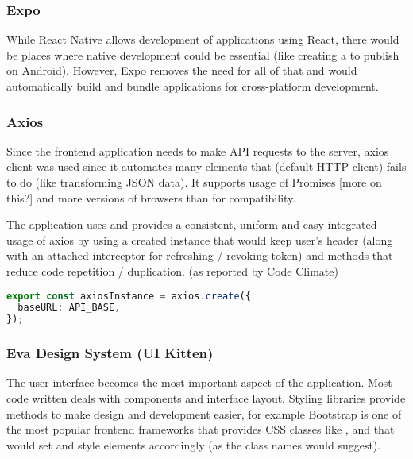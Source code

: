 \documentclass{l4proj}
\begin{document}
\subsubsection{Expo}

While React Native allows development of applications using React, there would be places where native development could be essential (like creating a  to publish on Android). However, Expo removes the need for all of that and would automatically build and bundle applications for cross-platform development.

\subsubsection{Axios}

Since the frontend application needs to make API requests to the server, axios client was used since it automates many elements that  (default HTTP client) fails to do (like transforming JSON data). It supports usage of Promises [more on this?] and more versions of browsers than  for compatibility.

The application uses and provides a consistent, uniform and easy integrated usage of axios by using a created instance that would keep user's  header (along with an attached interceptor for refreshing / revoking token) and methods that reduce code repetition / duplication. (as reported by Code Climate)

\begin{lstlisting}[language=typescript, caption={created axios instance in \href{https://github.com/ineshbose/portion-mate/blob/c51ee3f32d05df641157467169e9659732202b7b/src/app/api/index.ts\#L20}{./src/app/api/index.ts}}]
export const axiosInstance = axios.create({
  baseURL: API_BASE,
});
\end{lstlisting}

\subsubsection{Eva Design System (UI Kitten)}

The user interface becomes the most important aspect of the application. Most code written deals with components and interface layout. Styling libraries provide methods to make design and development easier, for example Bootstrap is one of the most popular frontend frameworks that provides CSS classes like ,  and  that would set and style elements accordingly (as the class names would suggest).
\end{document}
